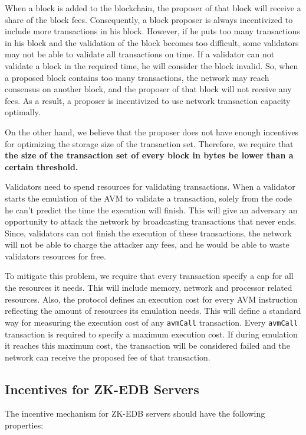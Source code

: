 When a block is added to the blockchain, the proposer of that block will receive a share of the block fees.
Consequently, a block proposer is always incentivized to include more transactions in his block. However, if he
puts too many transactions in his block and the validation of the block becomes too difficult, some validators
may not be able to validate all transactions on time. If a validator can not validate a block in the required
time, he will consider the block invalid. So, when a proposed block contains too many transactions, the network
may reach consensus on another block, and the proposer of that block will not receive any fees. As a result, a
proposer is incentivized to use network transaction capacity optimally.

On the other hand, we believe that the proposer does not have enough incentives for optimizing the storage size
of the transaction set. Therefore, we require that \textbf{the size of the transaction set of every block in
bytes be lower than a certain threshold.}

Validators need to spend resources for validating transactions. When a validator starts the emulation of the AVM
to validate a transaction, solely from the code he can't predict the time the execution will finish. This will
give an adversary an opportunity to attack the network by broadcasting transactions that never ends. Since,
validators can not finish the execution of these transactions, the network will not be able to charge the
attacker any fees, and he would be able to waste validators resources for free.

To mitigate this problem, we require that every transaction specify a cap for all the resources it needs. This
will include memory, network and processor related resources. Also, the protocol defines an execution cost for
every AVM instruction reflecting the amount of resources its emulation needs. This will define a standard way for
measuring the execution cost of any \texttt{avmCall} transaction. Every \texttt{avmCall} transaction is required
to specify a maximum execution cost. If during emulation it reaches this maximum cost, the transaction will be
considered failed and the network can receive the proposed fee of that transaction.


\subsection{Incentives for ZK-EDB Servers}\label{subsec:zk-edb-servers}

The incentive mechanism for ZK-EDB servers should have the following properties:

